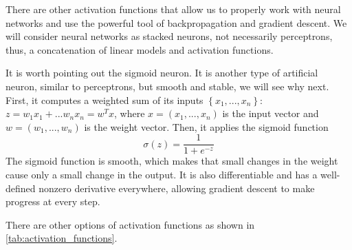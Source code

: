 There are other activation functions that allow us to properly work with neural networks and use the powerful tool of backpropagation and gradient descent. We will consider neural networks as stacked neurons, not necessarily perceptrons, thus, a concatenation of linear models and activation functions. 

It is worth pointing out the sigmoid neuron. It is another type of artificial neuron, similar to perceptrons, but smooth and stable, we will see why next. First, it computes a weighted sum of its inputs $\left\lbrace x_1,...,x_n\right\rbrace$: $z = w_1x_1+...w_nx_n = w^T x$, where $x=(x_1,...,x_n)$ is the input vector and $w = (w_1,...,w_n)$ is the weight vector. Then, it applies the sigmoid function
$$\sigma (z) = \frac{1}{1+e^{-z}}$$
The sigmoid function is smooth,  which makes that small changes in the weight cause only a small change in the output. It is also differentiable and has a well-defined nonzero derivative everywhere, allowing gradient descent to make progress at every step. 

There are other options of activation functions as shown in \autoref{tab:activation_functions}.


